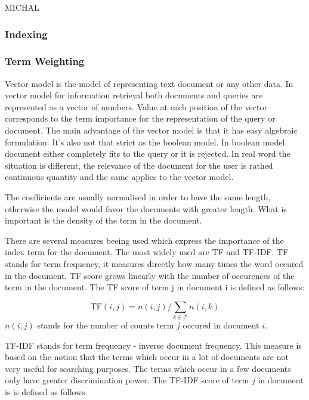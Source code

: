 MICHAL 

\subsubsection{Indexing}
\label{sec:indexing_term_weighting}

\subsubsection{Term Weighting}
\label{sec:term_weighting}

Vector model is the model of representing text document or any other data. In vector model for information retrieval both documents and queries are represented as a vector of numbers. Value at each position of the vector corresponds to the term importance for the representation of the query or document. The main advantage of the vector model is that it has easy algebraic formulation. It's also not that strict as the boolean model. In boolean model document either completely fits to the query or it is rejected. In real word the situation is different, the relevance of the document for the user is rathed continuous quantity and the same applies to the vector model.

The coefficients are usually normalised in order to have the same length, otherwise the model would favor the documents with greater length. What is important is the density of the term in the document.

There are several measures beeing used which express the importance of the index term for the document. The most widely used are TF and TF-IDF. 
TF stands for term frequency, it measures directly how many times the word occured in the document, TF score grows linearly with the number of occurences of the term in the document. The TF score of term j in document i is defined as follows:

\[\text{TF}(i,j) = n(i,j) / \sum_{k \in \mathcal{T}}{n(i,k)}\] $n(i,j)$ stands for the number of counts term $j$ occured in document $i$.

TF-IDF stands for term frequency - inverse document frequency. This measure is based on the notion that the terms which occur in a lot of documents are not very useful for searching purposes. The terms which occur in a few documents only have greater discrimination power. The TF-IDF score of term $j$ in document is is defined as follows.

